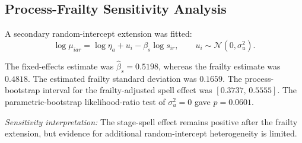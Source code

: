 \subsection{Process-Frailty Sensitivity Analysis}

A secondary random-intercept extension was fitted:
\[
\log\mu_{iar}=\log\eta_a+u_i-\beta_s\log s_{ir},
\qquad
u_i\sim\mathcal N(0,\sigma_u^2).
\]

The fixed-effects estimate was \(\widehat{\beta}_s=0.5198\), whereas the frailty estimate was \(0.4818\).
The estimated frailty standard deviation was \(0.1659\).
The process-bootstrap interval for the frailty-adjusted spell effect was \([0.3737,\,0.5555]\).
The parametric-bootstrap likelihood-ratio test of \(\sigma_u^2=0\) gave \(p=0.0601\).

\textit{Sensitivity interpretation:} The stage-spell effect remains positive after the frailty extension, but evidence for additional random-intercept heterogeneity is limited.
